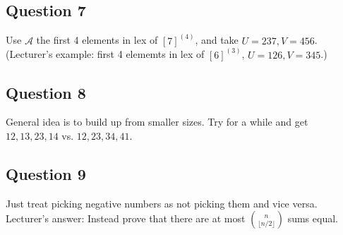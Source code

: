 \documentclass[a4paper]{article}
\begin{document}
\subsection{Question 7}
Use $\mathcal{A}$ the first 4 elements in lex of $[7]^{(4)}$, and take $U=237, V=456$.\\
(Lecturer's example: first 4 elememts in lex of $[6]^{(3)}$, $U=126, V=345$.)

\subsection{Question 8}
General idea is to build up from smaller sizes. Try for a while and get $12,13,23,14$ vs. $12,23,34,41$.

\subsection{Question 9}
Just treat picking negative numbers as not picking them and vice versa.\\
Lecturer's answer: Instead prove that there are at most ${n \choose {\lfloor n/2 \rfloor}}$ sums equal.
\end{document}
